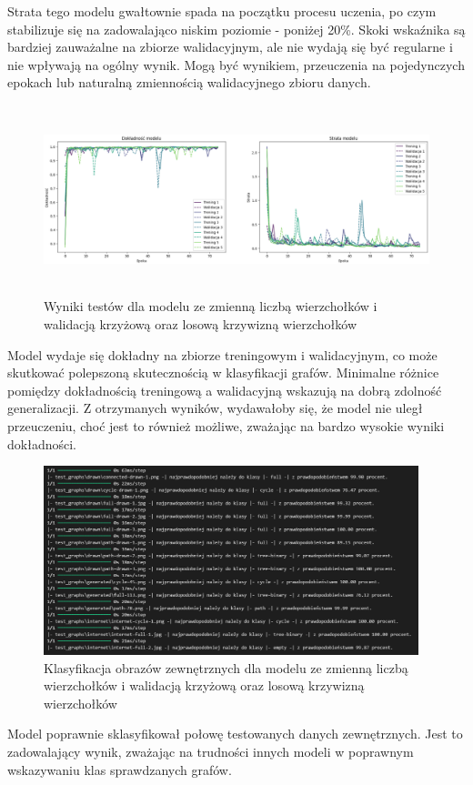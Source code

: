 Strata tego modelu gwałtownie spada na początku procesu uczenia,
po czym stabilizuje się na zadowalająco niskim poziomie - poniżej 20\%.
Skoki wskaźnika są bardziej zauważalne na zbiorze walidacyjnym,
ale nie wydają się być regularne i nie wpływają na ogólny wynik.
Mogą być wynikiem, przeuczenia na pojedynczych epokach lub naturalną zmiennością walidacyjnego zbioru danych.

\begin{figure}[ht]
	\centering
	\includegraphics[height=5.5cm]{resources/tests/images/v3/multiple_edges_crossvalid_img.png}
	\caption{Wyniki testów dla modelu ze zmienną liczbą wierzchołków i walidacją krzyżową oraz losową krzywizną wierzchołków}
	\label{Fig:tests-csvar-1}
\end{figure}
\FloatBarrier

Model wydaje się dokładny na zbiorze treningowym i walidacyjnym,
co może skutkować polepszoną skutecznością w klasyfikacji grafów.
Minimalne różnice pomiędzy dokładnością treningową a walidacyjną wskazują na dobrą zdolność generalizacji.
Z otrzymanych wyników, wydawałoby się, że model nie uległ przeuczeniu,
choć jest to również możliwe, zważając na bardzo wysokie wyniki dokładności. 

\begin{figure}[ht]
	\centering
	\includegraphics[height=5.5cm]{resources/tests/images/v3/multiple_edges_crossvalid_txt.png}
	\caption{Klasyfikacja obrazów zewnętrznych dla modelu ze zmienną liczbą wierzchołków i walidacją krzyżową oraz losową krzywizną wierzchołków}
	\label{Fig:tests-csvar-2}
\end{figure}
\FloatBarrier

Model poprawnie sklasyfikował połowę testowanych danych zewnętrznych.
Jest to zadowalający wynik, zważając na trudności innych modeli w poprawnym wskazywaniu klas sprawdzanych grafów.